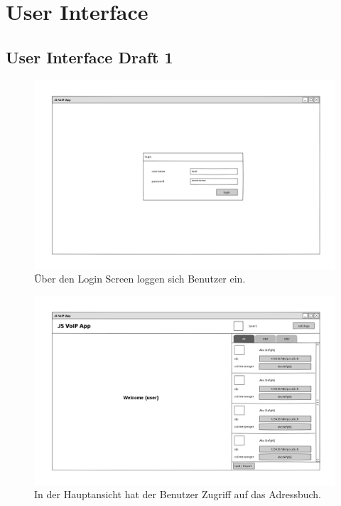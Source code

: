 \chapter{User Interface}

\section{User Interface Draft 1}
	\label{uiDrafts} 

	\begin{figure}[H]
		\centering
		\includegraphics[height=0.3\textheight]{../ui/img/uiDraft1/login_page.png}
		\caption{Über den Login Screen loggen sich Benutzer ein.}
		\label{login screen}
	\end{figure}
	\begin{figure}[H]
		\centering
		\includegraphics[height=0.3\textheight]{../ui/img/uiDraft1/main_view.png}
		\caption{In der Hauptansicht hat der Benutzer Zugriff auf das Adressbuch.}
		\label{main screen}
	\end{figure}
